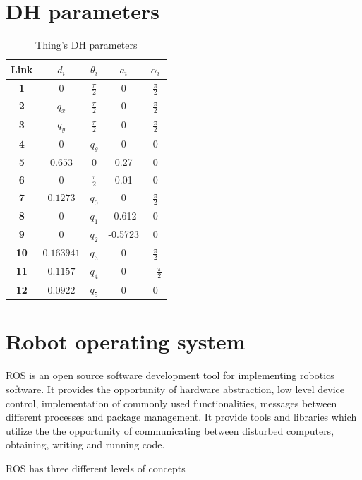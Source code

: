 \documentclass[times, utf8, diplomski, english]{fer}
\begin{document}
\chapter{DH parameters}
\begin{table}
\caption{Thing's DH parameters}
 \begin{tabular}{@{}ccccc@{}}
  \toprule
 \textbf{Link}& $d_i$& $\theta_i$& $a_i$ & $\alpha_i$\\ \midrule \midrule
 \textbf{1} & $0$ & $\frac{\pi}{2}$ & $0$& $\frac{\pi}{2}$\\ \midrule
 \textbf{2} & $q_x$ & $\frac{\pi}{2}$ & $0$& $\frac{\pi}{2}$\\ \midrule
 \textbf{3} & $q_y$ & $\frac{\pi}{2}$ & $0$& $\frac{\pi}{2}$\\ \midrule
 \textbf{4} & $0$ &$q_{\theta}$ & 0& 0\\ \midrule
 \textbf{5} & $0.653$ & $0$ & 0.27& 0\\ \midrule
 \textbf{6} & $0$ & $\frac{\pi}{2}$ & 0.01& 0\\ \midrule
 \textbf{7} & $0.1273$ & $q_0$ & 0& $\frac{\pi}{2}$\\ \midrule
 \textbf{8} & $0$ & $q_1$ & -0.612& 0\\ \midrule
 \textbf{9} & $0$ & $q_2$ & -0.5723& 0\\ \midrule
 \textbf{10} & $ 0.163941$ & $q_3$ & 0& $\frac{\pi}{2}$\\ \midrule
 \textbf{11} & $0.1157$ & $q_4$ & 0& $-\frac{\pi}{2}$\\ \midrule
 \textbf{12} & $0.0922$ & $q_5$ & 0& 0\\ \bottomrule
 \end{tabular}
\label{DH}
\end{table}

\chapter{Robot operating system}\label{sec:def_ROS}
ROS is an open source software development tool for implementing robotics software. It provides the opportunity of hardware abstraction, low level device control, implementation of commonly used functionalities, messages between different processes and package management. It provide tools and libraries which utilize the the opportunity of communicating between disturbed computers, obtaining, writing and running code.


ROS has three different levels of concepts
\end{document}
